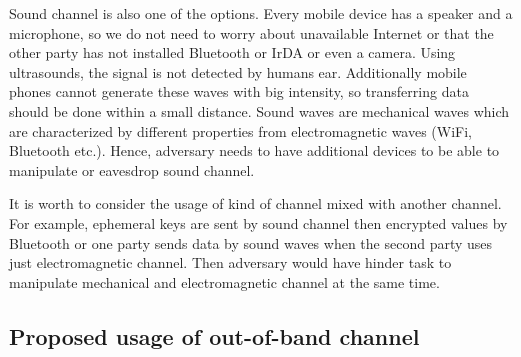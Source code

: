 \documentclass[11pt,titlepage]{article}
\theoremstyle{plain}
\begin{document}
\vspace{5mm}

Sound channel is also one of the options. Every mobile device has a speaker and a microphone, so we do not need to worry about unavailable Internet or that the other party has not installed Bluetooth or IrDA or even a camera. Using ultrasounds, the signal is not detected by humans ear. Additionally mobile phones cannot generate these waves with big intensity, so transferring data should be done within a small distance. Sound waves are mechanical waves which are characterized by different properties from electromagnetic waves (WiFi, Bluetooth etc.). Hence, adversary needs to have additional devices to be able to manipulate or eavesdrop sound channel. 

It is worth to consider the usage of kind of channel mixed with another channel. For example, ephemeral keys are sent by sound channel then encrypted values by Bluetooth or one party sends data by sound waves when the second party uses just electromagnetic channel. Then adversary would have hinder task to manipulate mechanical and electromagnetic channel at the same time.

\subsection{Proposed usage of out-of-band channel}
\end{document}
